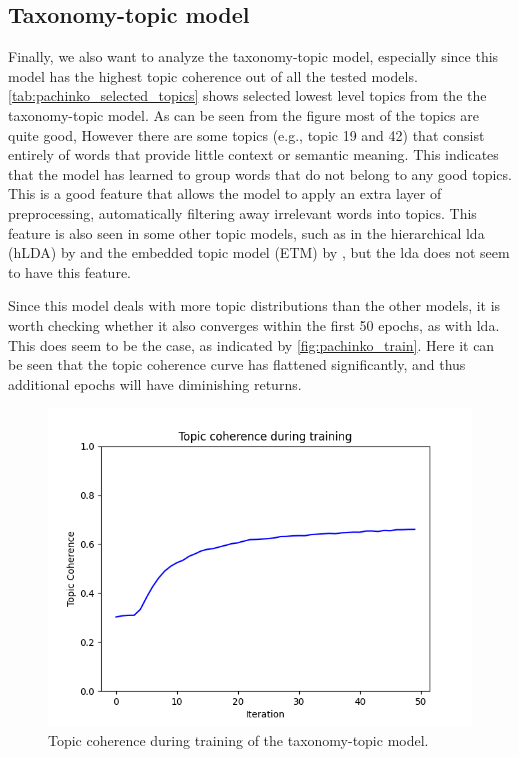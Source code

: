 \subsection{Taxonomy-topic model}\label{sec:taxonomy_analysis}
Finally, we also want to analyze the taxonomy-topic model, especially since this model has the highest topic coherence out of all the tested models.
\autoref{tab:pachinko_selected_topics} shows selected lowest level topics from the the taxonomy-topic model.
As can be seen from the figure most of the topics are quite good, However there are some topics (e.g., topic 19 and 42) that consist entirely of words that provide little context or semantic meaning.
This indicates that the model has learned to group words that do not belong to any good topics.
This is a good feature that allows the model to apply an extra layer of preprocessing, automatically filtering away irrelevant words into topics.
This feature is also seen in some other topic models, such as in the hierarchical \gls{lda} (hLDA) by \citet{hLDA2004} and the embedded topic model (ETM) by \citet{dieng2020topic}, but the \gls{lda} does not seem to have this feature.

Since this model deals with more topic distributions than the other models, it is worth checking whether it also converges within the first 50 epochs, as with \gls{lda}.
This does seem to be the case, as indicated by \autoref{fig:pachinko_train}.
Here it can be seen that the topic coherence curve has flattened significantly, and thus additional epochs will have diminishing returns.

\begin{figure}
	\centering
	\includegraphics[width= \linewidth]{figures/pachinko_training.PNG}
	\caption{Topic coherence during training of the taxonomy-topic model.}
	\label{fig:pachinko_train}
\end{figure}

